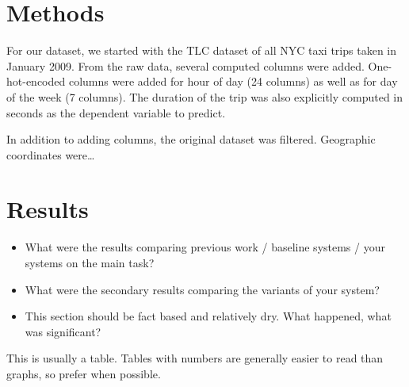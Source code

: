 \documentclass{article}
\begin{document}
\section{Methods}

% 
% 
% 

For our dataset, we started with the TLC dataset of all NYC taxi trips taken in
January 2009. From the raw data, several computed columns were added.
One-hot-encoded columns were added for hour of day (24 columns) as well as for
day of the week (7 columns). The duration of the trip was also explicitly
computed in seconds as the dependent variable to predict.

In addition to adding columns, the original dataset was filtered. Geographic
coordinates were\ldots


\section{Results}

\begin{itemize}
\item What were the results comparing previous work / baseline systems / your systems on the main task?
\item What were the secondary results comparing the variants of your system?
\item This section should be fact based and relatively dry. What happened, what was significant?
\end{itemize}

\begin{table}
  \centering
  \missingfigure{}
  \caption{This is usually a table. Tables with numbers are generally easier to read than graphs, so prefer when possible.}
  \label{fig:mainres}
\end{table}
\end{document}
